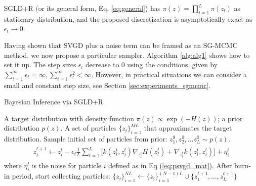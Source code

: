 \begin{proposition}
SGLD+R (or its general form, Eq. \eqref{eq:general}) has $\pi({z}) = \prod_{l=1}^L \pi({z}_l)$ as stationary distribution, and the proposed discretization is asymptotically exact as $\epsilon_t \rightarrow 0$.
\end{proposition}
\noindent Having shown that SVGD plus a noise term can be framed as an SG-MCMC method, we now propose a particular sampler. 
Algorithm \ref{alg:alg1} shows how to set it up. The step sizes $\epsilon_t$ decrease to $0$ using the \cite{robbins} conditions, given by $\sum_{t=1}^\infty \epsilon_t = \infty, \sum_{t=1}^\infty \epsilon_t^2 < \infty$. However, in practical situations we can consider a small and constant step size, see Section \ref{sec:experiments_sgmcmc}. 

\begin{algorithm}[!h] %
\caption{Bayesian Inference via SGLD+R}  
\label{alg:alg1}
\begin{algorithmic}[1]
 A target distribution with density function $\pi({z}) \propto \exp (-H({z}))$; a prior distribution $p({z})$. 
 A set of particles $\{{z}_i\}_{i=1}^{ML}$ that approximates the target distribution.  
\State Sample initial set of particles from prior: ${z}_1^0, {z}_2^0, \ldots {z}_L^0 \sim p({z})$.
\State 
\begin{align} \label{eq:psvgd_alg}
\begin{split}
&{z}_i^{t+1}  \gets  {z}_i^t  - \epsilon_t \frac{1}{L}\sum_{l=1}^L\big[  k({z}_l^t, {z}_i^t)  \nabla_{{z}_l^t} H({z}_l^t) + \nabla_{{z}_l^t} k({z}_l^t, {z}_i^t)\big] + {\eta}_i^t
\end{split}
\end{align}
\State where ${\eta}_i^t$ is the noise for particle $i$ defined as in Eq (\ref{eq:psvgd_mat}).
\State After  burn-in period, start collecting particles: $ \{{z}_i\}_{i=1}^{NL} \gets \{{z}_i\}_{i=1}^{(N-1)L} \cup \{ {z}_1^{t+1}, \ldots,  {z}_L^{t+1} \} $ 
\EndFor
\end{algorithmic}
\end{algorithm}

